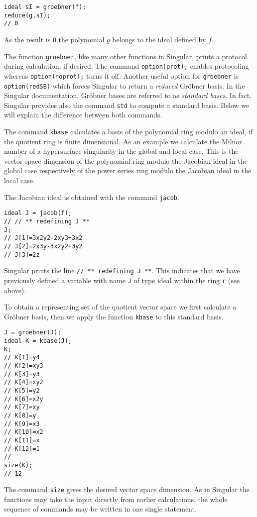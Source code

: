 \documentclass[12pt]{amsart}
\begin{document}
\begin{verbatim}
ideal sI = groebner(f);
reduce(g,sI);
// 0
\end{verbatim}

As the result is $0$ the polynomial $g$ belongs to the ideal defined by $f$.

The function \texttt{groebner}, like many other functions in Singular, prints a protocol during calculation, 
if desired. The command \verb+option(prot);+ enables protocoling whereas \verb+option(noprot);+ turns it off.
Another useful option for \texttt{groebner} is \verb+option(redSB)+ which forces Singular to return a \emph{reduced}
Gr\"obner basis. In the Singular documentation, Gr\"obner bases are referred to as \emph{standard bases}. In fact, Singular provides also the command \verb+std+ to compute a standard basis. Below we will explain the difference between both commands. 

The command \texttt{kbase} calculates a basis of the polynomial ring modulo an ideal, 
if the quotient ring is finite dimensional. As an example we calculate the Milnor number of a 
hypersurface singularity in the global and local case. This is the vector space dimension of the polynomial ring modulo the 
Jacobian ideal in the global case respectively of the power series ring modulo the Jacobian ideal in the local case. 

The Jacobian ideal is obtained with the command \texttt{jacob}.

\begin{verbatim}
ideal J = jacob(f);
// // ** redefining J **
J;
// J[1]=3x2y2-2xy3+3x2
// J[2]=2x3y-3x2y2+3y2
// J[3]=2z
\end{verbatim}

Singular prints the line \verb+// ** redefining J **+. This indicates that we have previously defined a variable with 
name \verb+J+  of type ideal within the ring \verb+r+ (see above).

To obtain a representing set of the quotient vector space we first calculate a Gr\"obner basis, then 
we apply the function \texttt{kbase} to this standard basis.

\begin{verbatim}
J = groebner(J);
ideal K = kbase(J);
K;
// K[1]=y4
// K[2]=xy3
// K[3]=y3
// K[4]=xy2
// K[5]=y2
// K[6]=x2y
// K[7]=xy
// K[8]=y
// K[9]=x3
// K[10]=x2
// K[11]=x
// K[12]=1
//
size(K);
// 12
\end{verbatim}

The command \texttt{size} gives the desired vector space 
dimension. As in Singular the functions may take the input directly from earlier calculations, 
the whole sequence of commands may be written in one single statement.
\end{document}
